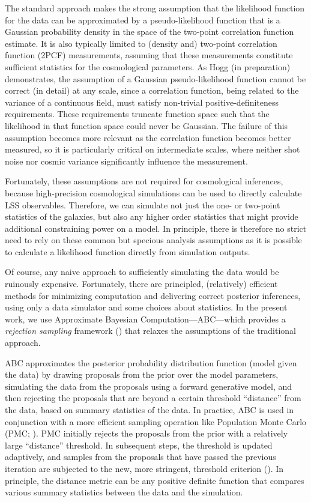 The standard approach makes the strong assumption that the likelihood function 
for the data can be approximated by a pseudo-likelihood function that is a Gaussian
probability density in the space of the two-point correlation function estimate. 
It is also typically limited to (density and) two-point correlation 
function (2PCF) measurements, assuming that these measurements constitute 
sufficient statistics for the cosmological parameters. 
As Hogg (in preparation) demonstrates, the assumption of a Gaussian 
pseudo-likelihood function cannot be correct (in detail) at any scale, 
since a correlation function, being related to the 
variance of a continuous field, must satisfy non-trivial positive-definiteness 
requirements. These requirements truncate function space such that the 
likelihood in that function space could never be Gaussian. The failure of this 
assumption becomes more relevant as the correlation function becomes better measured, 
so it is particularly critical on intermediate scales, where neither shot 
noise nor cosmic variance significantly influence the measurement. 

Fortunately, these assumptions are not required for cosmological inferences, 
because high-precision cosmological simulations can be used to directly calculate 
LSS observables. Therefore, we can simulate not just the one- or two-point statistics of the galaxies, but also any higher order statistics that might provide additional constraining power on a model. In principle, there is therefore no strict need to rely on these common but specious analysis  assumptions as it is possible to calculate a likelihood function directly from simulation outputs.

Of course, any naive approach to sufficiently simulating the data would be ruinously
expensive. Fortunately, there are principled, (relatively) efficient methods for 
minimizing computation and delivering correct posterior inferences, using only a 
data simulator and some choices about statistics. 
In the present work, we use Approximate Bayesian Computation---ABC---which provides a \emph{rejection sampling} 
framework (\citealt{abcrejectionsampling}) that relaxes the assumptions of the traditional approach. 

ABC approximates the posterior probability distribution function (model given the data)
by drawing proposals from the prior over the model parameters, simulating the data from the 
proposals using a forward generative model, and then rejecting the proposals that are beyond 
a certain threshold ``distance'' from the data, based on summary statistics of the data. 
In practice, ABC is used in conjunction with a more efficient sampling operation like 
Population Monte Carlo (PMC; \citealt{smc}). 
PMC initially rejects the proposals from the prior with a relatively large ``distance'' threshold. 
In subsequent steps, the threshold is updated adaptively, and samples from the proposals that have 
passed the previous iteration are subjected to the new, more stringent, threshold criterion (\citealt{abcpmc}). 
In principle, the distance metric can be any positive definite function that compares 
various summary statistics between the data and the simulation.  


